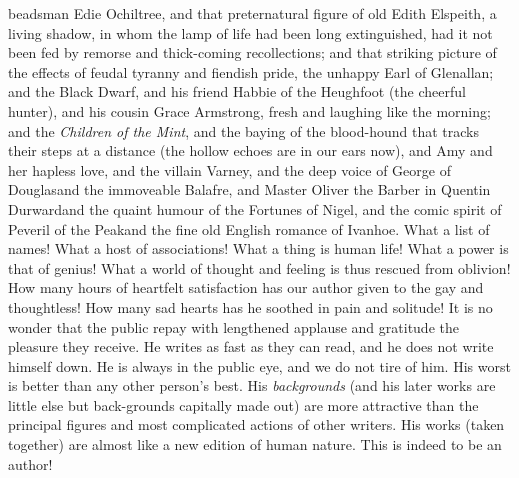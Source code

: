 {beadsman Edie Ochiltree, and that preternatural figure of old
Edith Elspeith, a living shadow, in whom the lamp of life had been
long extinguished, had it not been fed by remorse and
thick-coming recollections; and that striking picture of the
effects of feudal tyranny and fiendish pride, the unhappy Earl of
Glenallan; and the Black Dwarf, and his friend Habbie of the
Heughfoot (the cheerful hunter), and his cousin Grace Armstrong,
fresh and laughing like the morning; and the \emph{Children of the
Mint}, and the baying of the blood-hound that tracks their steps
at a distance (the hollow echoes are in our ears now), and Amy and
her hapless love, and the villain Varney, and the deep voice of
George of Douglas\textemdash and the immoveable Balafre, and Master Oliver
the Barber in Quentin Durward\textemdash and the quaint humour of the
Fortunes of Nigel, and the comic spirit of Peveril of the
Peak\textemdash and the fine old English romance of Ivanhoe. What a list of
names! What a host of associations! What a thing is human life!
What a power is that of genius! What a world of thought and
feeling is thus rescued from oblivion! How many hours of heartfelt
satisfaction has our author given to the gay and thoughtless! How
many sad hearts has he soothed in pain and solitude! It is no
wonder that the public repay with lengthened applause and
gratitude the pleasure they receive. He writes as fast as they can
read, and he does not write himself down. He is always in the
public eye, and we do not tire of him. His worst is better than
any other person's best. His \emph{backgrounds} (and his later works
are little else but back-grounds capitally made out) are more
attractive than the principal figures and most complicated actions
of other writers. His works (taken together) are almost like a new
edition of human nature.  This is indeed to be an author!}

